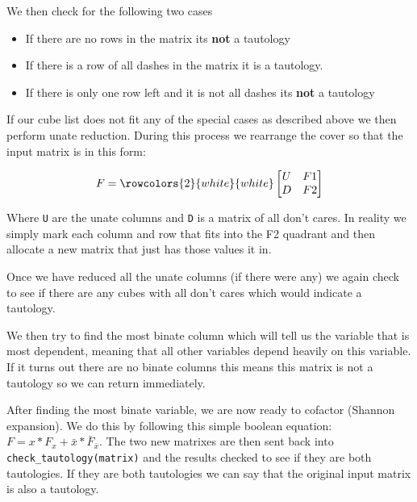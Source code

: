 \documentclass[10pt]{article}
\begin{document}
        We then check for the following two cases

        \begin{itemize}
            \item If there are no rows in the matrix its \textbf{not} a tautology
            \item If there is a row of all dashes in the matrix it is a tautology.
            \item If there is only one row left and it is not all dashes its \textbf{not} a tautology
        \end{itemize}

        If our cube list does not fit any of the special cases as described
        above we then perform unate reduction. During this process we rearrange
        the cover so that the input matrix is in this form:

        $$
        F =
        \rowcolors{2}{white}{white}
        \begin{bmatrix}
            U & F1  \\
            D & F2
        \end{bmatrix}
        $$

        Where \texttt{U} are the unate columns and \texttt{D} is a matrix of
        all don't cares. In reality we simply mark each column and row that
        fits into the F2 quadrant and then allocate a new matrix that just has
        those values it in.

        Once we have reduced all the unate columns (if there were any) we again
        check to see if there are any cubes with all don't cares which would
        indicate a tautology.

        We then try to find the most binate column which will tell us the
        variable that is most dependent, meaning that all other variables
        depend heavily on this variable. If it turns out there are no binate
        columns this means this matrix is not a tautology so we can return
        immediately.

        After finding the most binate variable, we are now ready to cofactor
        (Shannon expansion). We do this by following this simple boolean
        equation: $ F = x*F_{x} + \bar{x}*\bar{F}_{\bar{x}} $. The two new
        matrixes are then sent back into \texttt{check\_tautology(matrix)} and
        the results checked to see if they are both tautologies. If they are
        both tautologies we can say that the original input matrix is also a
        tautology.
\end{document}
